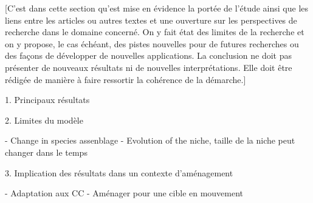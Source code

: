 [C’est dans cette section qu’est mise en évidence la portée de l’étude ainsi que les liens entre les articles ou autres textes et une ouverture sur les perspectives de recherche dans le domaine concerné. On y fait état des limites de la recherche et on y propose, le cas échéant, des pistes nouvelles pour de futures recherches ou des façons de développer de nouvelles applications. La conclusion ne doit pas présenter de nouveaux résultats ni de nouvelles interprétations. Elle doit être rédigée de manière à faire ressortir la cohérence de la démarche.]


1. Principaux résultats

2. Limites du modèle

- Change in species assenblage
- Evolution of the niche, taille de la niche peut changer dans le temps

3. Implication des résultats dans un contexte d'aménagement

- Adaptation aux CC
- Aménager pour une cible en mouvement